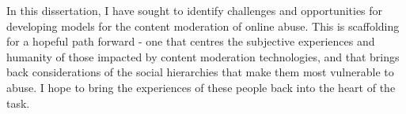 In this dissertation, I have sought to identify challenges and opportunities for developing models for the content moderation of online abuse. This is scaffolding for a hopeful path forward - one that centres the subjective experiences and humanity of those impacted by content moderation technologies,  and that brings back considerations of the social hierarchies that make them most vulnerable to abuse.
I hope to bring the experiences of these people back into the heart of the task.

%
%
